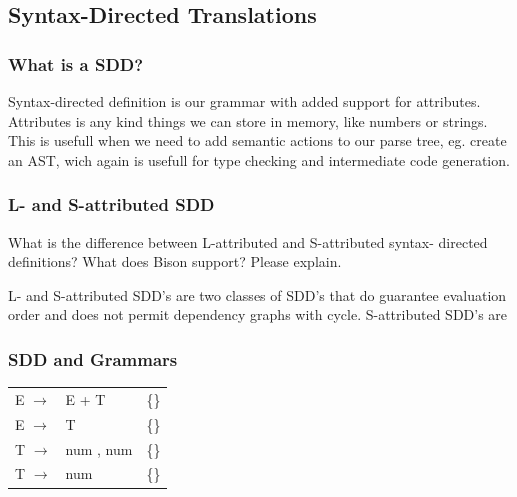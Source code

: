 \documentclass{article}
\begin{document}
\subsection{Syntax-Directed Translations}
\subsubsection{What is a SDD?}
Syntax-directed definition is our grammar with added support for attributes.
Attributes is any kind things we can store in memory, like numbers or strings.
This is usefull when we need to add semantic actions to our parse tree, eg.
create an AST, wich again is usefull for type checking and intermediate code
generation.

\subsubsection{L- and S-attributed SDD}
What is the difference between L-attributed and S-attributed syntax-
directed definitions? What does Bison support? Please explain.

L- and S-attributed SDD's are two classes of SDD's that do guarantee evaluation
order and does not permit dependency graphs with cycle.
S-attributed SDD's are 

\subsubsection{SDD and Grammars}
\begin{tabular}{lll}
E $\rightarrow$ & E + T & \{\}\\
E $\rightarrow$ & T & \{\}\\
T $\rightarrow$ & num , num & \{\}\\ 
T $\rightarrow$ & num & \{\}\\
\end{tabular}

\printindex
\end{document}
